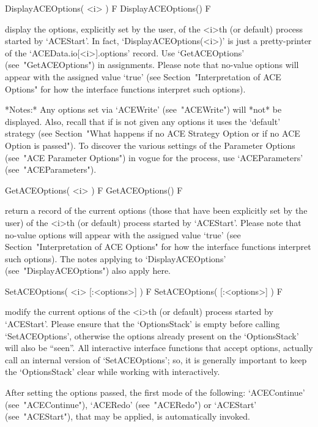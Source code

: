 \>DisplayACEOptions( <i> ) F
\>DisplayACEOptions() F

display the options, explicitly set by the user, of the  <i>th  (or  default)  process  started  by
`ACEStart'. In fact, `DisplayACEOptions(<i>)' is just a pretty-printer
of   the   `ACEData.io[<i>].options'   record.   Use   `GetACEOptions'
(see~"GetACEOptions") in assignments. Please note that no-value {\ACE}
options  will   appear   with   the   assigned   value   `true'   (see
Section~"Interpretation of ACE Options" for how the  {\ACE}  interface
functions interpret such options). 

*Notes:* 
Any  options  set  via  `ACEWrite'  (see~"ACEWrite")  will  *not*   be
displayed. Also, recall that if {\ACE} is not  given  any  options  it
uses the `default' strategy  (see  Section~"What  happens  if  no  ACE
Strategy Option or if no ACE  Option  is  passed").  To  discover  the
various settings of the {\ACE} Parameter Options  (see~"ACE  Parameter
Options")  in  vogue  for  the  {\ACE}  process,  use  `ACEParameters'
(see~"ACEParameters").

\>GetACEOptions( <i> ) F
\>GetACEOptions() F

return  a  record  of  the  current  options  (those  that  have  been
explicitly set by the user) of the <i>th (or default) process  started
by `ACEStart'. Please note that no-value {\ACE}  options  will  appear
with the assigned value `true'  (see  Section~"Interpretation  of  ACE
Options"  for  how  the  {\ACE}  interface  functions  interpret  such
options).    The     notes     applying     to     `DisplayACEOptions'
(see~"DisplayACEOptions") also apply here.

\>SetACEOptions( <i> [:<options>] ) F
\>SetACEOptions( [:<options>] ) F

modify the current options of the <i>th (or default)  process  started
by `ACEStart'. Please ensure that the `OptionsStack' is  empty  before
calling `SetACEOptions', otherwise the options already present on  the
`OptionsStack' will also be ``seen''. All interactive {\ACE} interface
functions that accept options, actually call an  internal  version  of
`SetACEOptions';  so,  it  is  generally   important   to   keep   the
`OptionsStack' clear while working with {\ACE} interactively.

After setting the options passed, the first  mode  of  the  following:
`ACEContinue'  (see~"ACEContinue"),   `ACERedo'   (see~"ACERedo")   or
`ACEStart' (see~"ACEStart"), that may  be  applied,  is  automatically
invoked.


